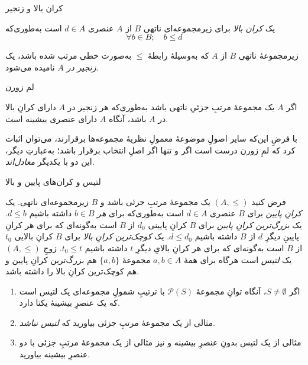 \begin{frame}[t]{کران بالا و زنجیر}
    \begin{definition}
        یک \textit{کران بالا} برای زیرمجموعه‌ای ناتهی $B$ از $A$ عنصری $d \in A$ است به‌طوری‌که
        \[
            \forall b \in B; \quad b \le d
        \]


    \end{definition}

    \begin{definition}
        زیرمجموعهٔ ناتهی $B$ از $A$ که به‌وسیلهٔ رابطهٔ $\le$ به‌صورت خطی مرتب شده باشد، یک \textit{زنجیر در $A$} نامیده می‌شود.
    \end{definition}



\end{frame}

\begin{frame}[t]{لم زورن}

    \begin{definition}[لم زورن ]
        اگر $A$ یک مجموعهٔ مرتبِ جزئیِ ناتهی باشد به‌طوری‌که هر زنجیر در $A$ دارای کرانِ بالا در $A$ باشد، آنگاه $A$ دارای عنصری بیشینه است.
    \end{definition}


    با فرضِ این‌که سایر اصولِ موضوعهٔ معمولِ نظریهٔ مجموعه‌ها برقرارند، می‌توان اثبات کرد که لمِ زورن درست است اگر و تنها اگر اصلِ انتخاب برقرار باشد؛ به‌عبارتِ دیگر، این دو با یکدیگر \textit{معادل‌اند.}

\end{frame}
\begin{frame}[t]{لتیس و کران‌های پایین و بالا}
    \begin{exercise}
        فرض کنید $(A,\le)$ یک مجموعهٔ مرتبِ جزئی باشد و $B$ زیرمجموعه‌ای ناتهی. یک \textit{کرانِ پایین} برای $B$ عنصری $d \in A$ است به‌طوری‌که برای \textit{هر} $b \in B$ داشته باشیم $d \le b$. یک \textit{بزرگ‌ترین کرانِ پایین } برای $B$ کرانِ پایینی $d_0$ از $B$ است به‌گونه‌ای که برای هر کرانِ پایینِ دیگرِ $d$ از $B$ داشته باشیم $d \le d_0$. یک \textit{کوچک‌ترین کرانِ بالا } برای $B$ کرانِ بالایی $t_0$ از $B$ است به‌گونه‌ای که برای هر کرانِ بالایِ دیگرِ $t$ داشته باشیم $t_0 \le t$. زوجِ $(A,\le)$ یک \textit{لتیس} است هرگاه برای همۀ $a,b \in A$ مجموعهٔ $\{a,b\}$ هم بزرگ‌ترین کرانِ پایین و هم کوچک‌ترین کرانِ بالا را داشته باشد.

        \begin{enumerate}
            \item اگر $S \ne \emptyset$، آنگاه توانِ مجموعهٔ $\mathcal{P}(S)$ با ترتیبِ شمولِ مجموعه‌ای یک لتیس است که یک عنصرِ بیشینهٔ یکتا دارد.
            \item مثالی از یک مجموعهٔ مرتبِ جزئی بیاورید که \textit{لتیس نباشد}.
            \item مثالی از یک لتیس بدونِ عنصرِ بیشینه و نیز مثالی از یک مجموعهٔ مرتبِ جزئی با دو عنصرِ بیشینه بیاورید.
        \end{enumerate}

    \end{exercise}
\end{frame}

